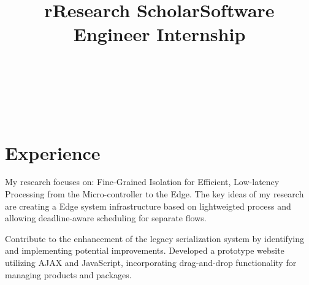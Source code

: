 \begin{format}
\title{r}\\
\\
\body\\
\end{format}
\section{Experience}
\title{Research Scholar}
\begin{position}
	\phantom{XXx}My research focuses on: Fine-Grained Isolation for Efficient, Low-latency Processing from the Micro-controller to the Edge. The key ideas of my research are creating a Edge system infrastructure based on lightweigted process and allowing deadline-aware scheduling for separate flows.
\end{position}

\title{Software Engineer Internship}
\begin{position}
	\phantom{XXx}Contribute to the enhancement of the legacy serialization system by identifying and implementing potential improvements. Developed a prototype website utilizing AJAX and JavaScript, incorporating drag-and-drop functionality for managing products and packages.
\end{position}
